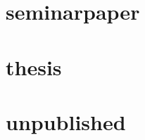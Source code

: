 \documentclass[a4paper]{article}
\begin{document}
\cite[1]{review}

\cite[1]{review}

\section{seminarpaper}

\cite[1]{seminarpaper}

\cite[1]{seminarpaper}

\section{thesis}

\cite[1]{thesis}

\cite[1]{thesis}

\section{unpublished}

\cite[1]{unpublished}

\cite[1]{unpublished}


\printbibliography
\end{document}
